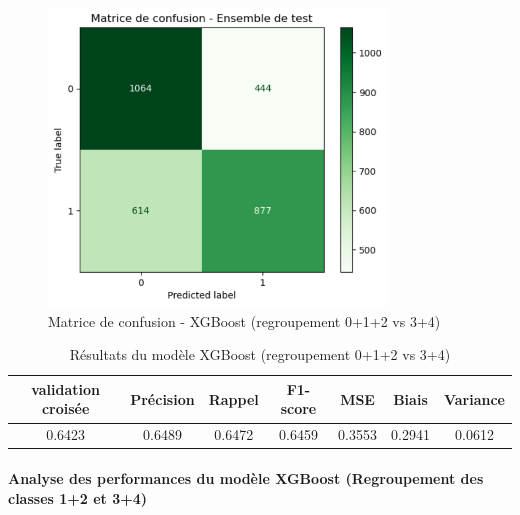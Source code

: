 \documentclass[a4paper,12pt]{article}
\begin{document}
 
\begin{figure}[H]

    \centering

    \includegraphics[width=0.8\textwidth]{XGBOST0.png}

    \caption{Matrice de confusion - XGBoost (regroupement 0+1+2 vs 3+4)}

    \label{fig:catboost012_conf}

\end{figure}
 
 
\begin{table}[h]

\centering

\begin{tabular}{|c|c|c|c|c|c|c|}

\hline

\textbf{validation croisée} & \textbf{Précision} & \textbf{Rappel} & \textbf{F1-score} & \textbf{MSE} & \textbf{Biais} & \textbf{Variance} \\

\hline

0.6423& 0.6489 & 0.6472 & 0.6459 & 0.3553 &  0.2941 &  0.0612 \\

\hline

\end{tabular}

\caption{Résultats du modèle XGBoost (regroupement 0+1+2 vs 3+4)}

\end{table}
 
    
 
\paragraph{Analyse des performances du modèle XGBoost (Regroupement des classes 1+2 et 3+4)}
\end{document}
